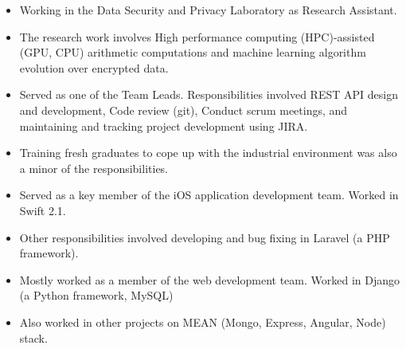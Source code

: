 \documentclass[10pt,a4paper,ragged2e]{altacv}
\begin{document}
\vspace{-5pt}
\vspace{-5pt}
\begin{itemize}
    \item Working in the Data Security and Privacy Laboratory as Research Assistant.
    \item The research work involves High performance computing (HPC)-assisted (GPU, CPU) arithmetic computations and machine learning algorithm evolution over encrypted data.
\end{itemize}

\vspace{-10pt}
\divider
\vspace{-5pt}

\begin{itemize}
    \item Served as one of the Team Leads. Responsibilities involved REST API design and development, Code review (git), Conduct scrum meetings, and maintaining and tracking project development using JIRA. 
    \item Training fresh graduates to cope up with the industrial environment was also a minor of the responsibilities.
\end{itemize}

\vspace{-10pt}
\divider
\vspace{-5pt}

\begin{itemize}
    \item Served as a key member of the iOS application development team. Worked in Swift 2.1.
    \item Other responsibilities involved developing and bug fixing in Laravel (a PHP framework).
\end{itemize}

\vspace{-10pt}
\divider
\vspace{-5pt}

\begin{itemize}
    \item Mostly worked as a member of the web development team. Worked in Django (a Python framework, MySQL)
    \item Also worked in other projects on MEAN (Mongo, Express, Angular, Node) stack.
\end{itemize}
\end{document}
